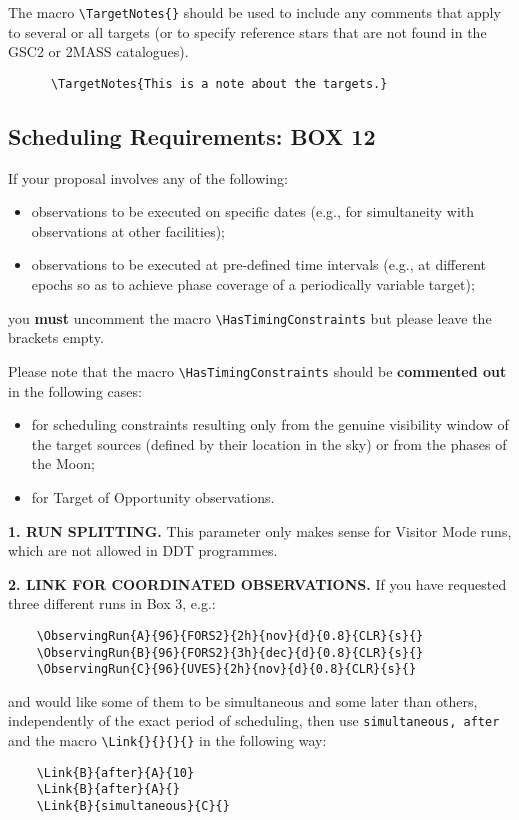 \documentclass{article}
\begin{document}
The macro \verb|\TargetNotes{}| should be used to include any
comments that apply to several or all targets (or to specify reference
stars that are not found in the GSC2 or 2MASS catalogues).
\begin{verbatim}
      \TargetNotes{This is a note about the targets.}
\end{verbatim}

\subsection{Scheduling Requirements: {\bf BOX 12}}
\label{sec:schedreq}
If your proposal involves any of the following:
\begin{itemize}
\item observations to be executed on specific dates (e.g., for
  simultaneity with observations at other facilities);
\item observations to be executed at pre-defined time intervals (e.g.,
  at different epochs so as to achieve phase coverage of a periodically
  variable target);
\end{itemize}
you {\bf must} uncomment the macro \verb|\HasTimingConstraints|
   but please leave
the brackets empty.

Please note that the macro \verb|\HasTimingConstraints| should 
be {\bf commented out} in the following cases:
\begin{itemize}
\item for scheduling constraints resulting only from the genuine
  visibility window of the target sources (defined by their location
  in the sky) or from the phases of the Moon; 
\item for Target of Opportunity observations.
\end{itemize} 

\medskip

{\bf 1. RUN SPLITTING.} This parameter only makes sense for Visitor Mode runs,
which are not allowed in DDT programmes.

\medskip

{\bf 2.  LINK FOR COORDINATED OBSERVATIONS.} If you have requested
three different runs in Box 3, e.g.:
\begin{verbatim}
    \ObservingRun{A}{96}{FORS2}{2h}{nov}{d}{0.8}{CLR}{s}{}
    \ObservingRun{B}{96}{FORS2}{3h}{dec}{d}{0.8}{CLR}{s}{}
    \ObservingRun{C}{96}{UVES}{2h}{nov}{d}{0.8}{CLR}{s}{}
\end{verbatim}
and would like some of them to be simultaneous and some later than
others, independently of the exact period of scheduling, then use
\verb|simultaneous, after| and the macro \verb|\Link{}{}{}{}| in the
following way:
\begin{verbatim}
    \Link{B}{after}{A}{10}
    \Link{B}{after}{A}{}
    \Link{B}{simultaneous}{C}{}
\end{verbatim}
\end{document}
